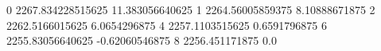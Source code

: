 0 2267.834228515625 11.383056640625
1 2264.56005859375 8.10888671875
2 2262.5166015625 6.0654296875
4 2257.1103515625 0.6591796875
6 2255.83056640625 -0.62060546875
8 2256.451171875 0.0
